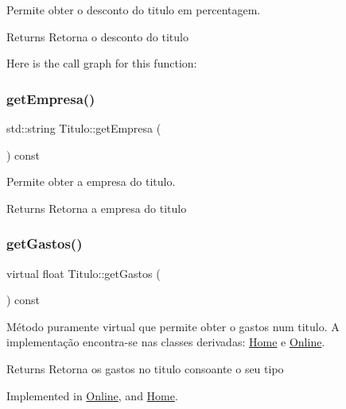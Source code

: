 Permite obter o desconto do titulo em percentagem. 

\begin{DoxyReturn}{Returns}
Retorna o desconto do titulo 
\end{DoxyReturn}
Here is the call graph for this function\+:
\mbox{\label{class_titulo_a48d810fe27da41cfb726fb5680a68471}} 
\subsubsection{\texorpdfstring{get\+Empresa()}{getEmpresa()}}
{\footnotesize\ttfamily std\+::string Titulo\+::get\+Empresa (\begin{DoxyParamCaption}{ }\end{DoxyParamCaption}) const}



Permite obter a empresa do titulo. 

\begin{DoxyReturn}{Returns}
Retorna a empresa do titulo 
\end{DoxyReturn}
\mbox{\label{class_titulo_a9272448eec05cd9c026c54824bf2e727}} 
\subsubsection{\texorpdfstring{get\+Gastos()}{getGastos()}}
{\footnotesize\ttfamily virtual float Titulo\+::get\+Gastos (\begin{DoxyParamCaption}{ }\end{DoxyParamCaption}) const\hspace{0.3cm}{\ttfamily [pure virtual]}}



Método puramente virtual que permite obter o gastos num titulo. A implementação encontra-\/se nas classes derivadas\+: \mbox{\hyperlink{class_home}{Home}} e \mbox{\hyperlink{class_online}{Online}}. 

\begin{DoxyReturn}{Returns}
Retorna os gastos no titulo consoante o seu tipo 
\end{DoxyReturn}


Implemented in \mbox{\hyperlink{class_online_ac3a2197523ee26effcacd9a2a9fe968e}{Online}}, and \mbox{\hyperlink{class_home_aff6d69739d404378524a591596b47856}{Home}}.

